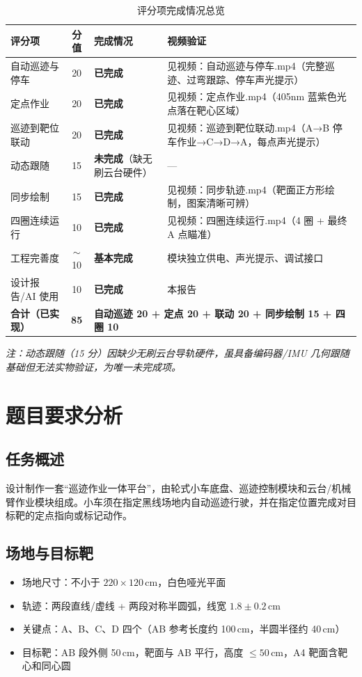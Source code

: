 \documentclass[12pt,a4paper]{ctexart}
\begin{document}
\begin{table}[H]
\centering
\caption{评分项完成情况总览}
\begin{tabular}{@{}p{3cm}cp{3.5cm}p{4.5cm}@{}}
\toprule
\textbf{评分项} & \textbf{分值} & \textbf{完成情况} & \textbf{视频验证} \\
\midrule
自动巡迹与停车 & 20 & \textbf{已完成} & 见视频：自动巡迹与停车.mp4（完整巡迹、过弯跟踪、停车声光提示）\\
定点作业       & 20 & \textbf{已完成} & 见视频：定点作业.mp4（405nm 蓝紫色光点落在靶心区域）\\
巡迹到靶位联动 & 20 & \textbf{已完成} & 见视频：巡迹到靶位联动.mp4（A→B 停车作业→C→D→A，每点声光提示）\\
\rowcolor{gray!15}
动态跟随       & 15 & \textbf{未完成}（缺无刷云台硬件）& — \\
同步绘制       & 15 & \textbf{已完成} & 见视频：同步轨迹.mp4（靶面正方形绘制，图案清晰可辨）\\
四圈连续运行   & 10 & \textbf{已完成} & 见视频：四圈连续运行.mp4（4 圈 + 最终 A 点瞄准）\\
工程完善度     & $\sim$10 & \textbf{基本完成} & 模块独立供电、声光提示、调试接口\\
设计报告/AI 使用 & 10 & \textbf{已完成} & 本报告\\
\midrule
\textbf{合计（已实现）} & \textbf{85} & \multicolumn{2}{l}{\textbf{自动巡迹 20 + 定点 20 + 联动 20 + 同步绘制 15 + 四圈 10}}\\
\bottomrule
\end{tabular}
\end{table}

\noindent\textit{注：动态跟随（15 分）因缺少无刷云台导轨硬件，虽具备编码器/IMU 几何跟随基础但无法实物验证，为唯一未完成项。}

\newpage

\section{题目要求分析}

\subsection{任务概述}
设计制作一套“巡迹作业一体平台”，由轮式小车底盘、巡迹控制模块和云台/机械臂作业模块组成。小车须在指定黑线场地内自动巡迹行驶，并在指定位置完成对目标靶的定点指向或标记动作。

\subsection{场地与目标靶}
\begin{itemize}[nosep]
    \item 场地尺寸：不小于 $220\times120$\,cm，白色哑光平面
    \item 轨迹：两段直线/虚线 + 两段对称半圆弧，线宽 $1.8\pm0.2$\,cm
    \item 关键点：A、B、C、D 四个（AB 参考长度约 100\,cm，半圆半径约 40\,cm）
    \item 目标靶：AB 段外侧 50\,cm，靶面与 AB 平行，高度 $\leq 50$\,cm，A4 靶面含靶心和同心圆
\end{itemize}
\end{document}
